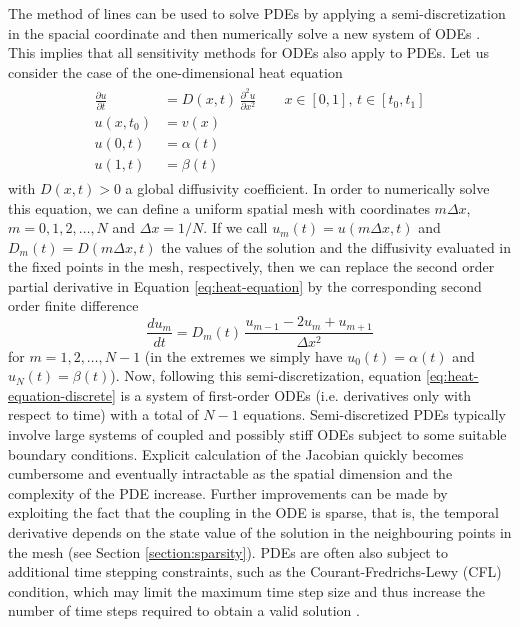 The method of lines can be used to solve PDEs by applying a semi-discretization in the spacial coordinate and then numerically solve a new system of ODEs \cite{ascher2008numerical}. 
This implies that all sensitivity methods for ODEs also apply to PDEs. 
Let us consider the case of the one-dimensional heat equation
\begin{align}
\begin{split}
 \frac{\partial u}{\partial t}
 &= 
 D(x,t) \, 
 \frac{\partial^2 u}{\partial x^2} \qquad x \in [0,1], \, t \in [t_0, t_1]\\
 u(x, t_0) &= v(x) \\
 u(0, t) &= \alpha(t) \\
 u(1, t) &= \beta(t)
 \label{eq:heat-equation}
\end{split}
\end{align}
with $D(x, t) > 0$ a global diffusivity coefficient.
In order to numerically solve this equation, we can define a uniform spatial mesh with coordinates $m \Delta x$, $m=0, 1, 2, \ldots, N$ and $\Delta x = 1 / N$.
If we call $u_m(t) = u(m \Delta x, t)$ and $D_m(t) = D(m\Delta x, t)$ the values of the solution and the diffusivity evaluated in the fixed points in the mesh, respectively, then we can replace the second order partial derivative in Equation \eqref{eq:heat-equation} by the corresponding second order finite difference
\begin{equation}
 \frac{d u_m}{dt} 
 = 
 D_m(t) \, 
 \frac{u_{m-1} - 2u_m + u_{m+1}}{\Delta x^2}
 \label{eq:heat-equation-discrete}
\end{equation}
for $m = 1, 2, \ldots, N-1$ (in the extremes we simply have $u_0(t) = \alpha(t)$ and $u_N(t)=\beta(t)$).
Now, following this semi-discretization, equation \eqref{eq:heat-equation-discrete} is a system of first-order ODEs  (i.e. derivatives only with respect to time) with a total of $N-1$ equations.
Semi-discretized PDEs typically involve large systems of coupled and possibly stiff ODEs subject to some suitable boundary conditions. 
Explicit calculation of the Jacobian quickly becomes cumbersome and eventually intractable as the spatial dimension and the complexity of the PDE increase.
Further improvements can be made by exploiting the fact that the coupling in the ODE is sparse, that is, the temporal derivative depends on the state value of the solution in the neighbouring points in the mesh (see Section \ref{section:sparsity}).
PDEs are often also subject to additional time stepping constraints, such as the Courant-Fredrichs-Lewy (CFL) condition, which may limit the maximum time step size and thus increase the number of time steps required to obtain a valid solution \cite{courantPartialDifferenceEquations1967}. 

